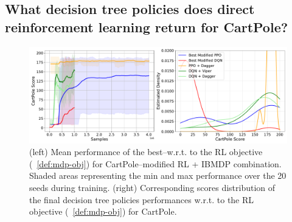 \subsection{What decision tree policies does direct reinforcement learning return for CartPole?}

\begin{figure}
    \centering
    \includegraphics[width=1\textwidth]{images/images_part1/ppo_tree_study.pdf}
    \caption{(left) Mean performance of the best--w.r.t. to the RL objective (~\ref{def:mdp-obj}) for CartPole--modified RL + IBMDP combination. Shaded areas representing the min and max performance over the 20 seeds during training. (right) Corresponding scores distribution of the final decision tree policies performances w.r.t. to the RL objective (~\ref{def:mdp-obj}) for CartPole.}\label{fig:ppo-trees}
\end{figure}


